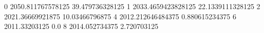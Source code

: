 0 2050.811767578125 39.479736328125
1 2033.4659423828125 22.1339111328125
2 2021.36669921875 10.03466796875
4 2012.212646484375 0.880615234375
6 2011.33203125 0.0
8 2014.052734375 2.720703125
